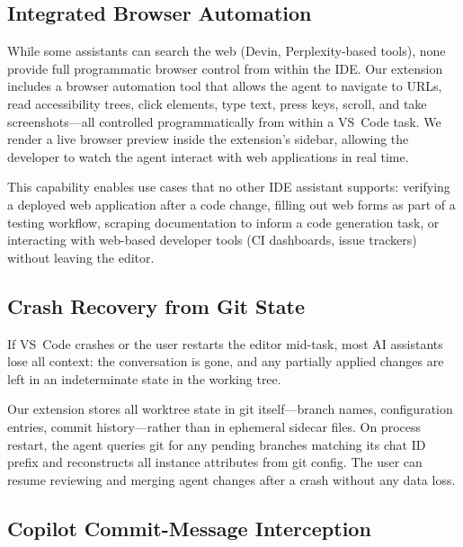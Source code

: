 \documentclass{article}
\begin{document}
\subsection{Integrated Browser Automation}
\label{sec:browser-feature}

While some assistants can search the web (Devin, Perplexity-based
tools), none provide full programmatic browser control from within the
IDE.  Our extension includes a browser automation tool that allows the
agent to navigate to URLs, read accessibility trees, click elements,
type text, press keys, scroll, and take screenshots---all controlled
programmatically from within a VS~Code task.  We render a live browser
preview inside the extension's sidebar, allowing the developer to
watch the agent interact with web applications in real time.

This capability enables use cases that no other IDE assistant supports:
verifying a deployed web application after a code change, filling out
web forms as part of a testing workflow, scraping documentation to
inform a code generation task, or interacting with web-based developer
tools (CI dashboards, issue trackers) without leaving the editor.

\subsection{Crash Recovery from Git State}
\label{sec:crash-recovery}

If VS~Code crashes or the user restarts the editor mid-task, most AI
assistants lose all context: the conversation is gone, and any
partially applied changes are left in an indeterminate state in the
working tree.

Our extension stores all worktree state in git itself---branch names,
configuration entries, commit history---rather than in ephemeral
sidecar files.  On process restart, the agent queries git for any
pending branches matching its chat ID prefix and reconstructs all
instance attributes from git config.  The user can resume reviewing
and merging agent changes after a crash without any data loss.

\subsection{Copilot Commit-Message Interception}
\label{sec:commit-interception}
\end{document}
